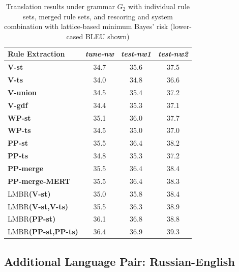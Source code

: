 \begin{table}[thbp]
\begin{center}
\begin{tabular}{|l|c|c|c|}
\hline
Rule Extraction & {\em \footnotesize tune-nw} & {\em \footnotesize test-nw1} & {\em \footnotesize test-nw2} \\ \cline{2-4}
\hline
{\bf V-st}    & 34.7  & 35.6  & 37.5 \\
{\bf V-ts}    & 34.0 & 34.8 & 36.6 \\
{\bf V-union}  & 34.5 & 35.4 & 37.2 \\
{\bf V-gdf}    & 34.4 & 35.3 & 37.1 \\
{\bf WP-st}    & 35.1 & 36.0 & 37.7 \\
{\bf WP-ts}    & 34.5 & 35.0 & 37.0 \\
{\bf PP-st}    & 35.5 & 36.4 & 38.2 \\
{\bf PP-ts}    & 34.8 & 35.3 & 37.2 \\
\hline
{\bf PP-merge}    & 35.5 & 36.4 &  38.4 \\
{\bf PP-merge-MERT}  & 35.5 & 36.4 &  38.3 \\
\hline
LMBR{\bf(V-st)}        & 35.0 & 35.8 & 38.4 \\
LMBR{\bf(V-st,V-ts)}   & 35.5 & 36.3 & 38.9 \\
LMBR{\bf(PP-st)}       & 36.1 & 36.8 & 38.8 \\
LMBR{\bf(PP-st,PP-ts)} & 36.4 & 36.9 & 39.3 \\
\hline
\end{tabular}
\end{center}
\caption{Translation results under grammar $G_2$ with individual rule sets, merged rule sets, and rescoring and system combination with lattice-based minimum Bayes' risk (lower-cased BLEU shown)}
\label{tab:symm}
\end{table}

\subsection{Additional Language Pair: Russian-English}

